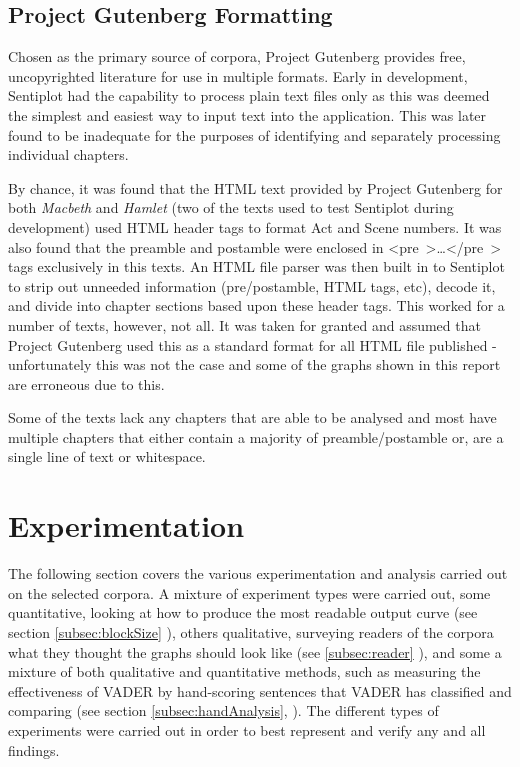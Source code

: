 \documentclass{article}
\begin{document}
{    \subsection{Project Gutenberg Formatting}
    \label{subsec:gutenbergFormat}
            Chosen as the primary source of corpora, Project Gutenberg provides free, uncopyrighted literature for use in multiple formats. Early in development, Sentiplot had the capability to process plain text files only as this was deemed the simplest and easiest way to input text into the application. This was later found to be inadequate for the purposes of identifying and separately processing individual chapters.

            By chance, it was found that the HTML text provided by Project Gutenberg for both \textit{Macbeth} and \textit{Hamlet} (two of the texts used to test Sentiplot during development) used HTML header tags to format Act and Scene numbers. It was also found that the preamble and postamble were enclosed in \mbox{\textless pre \textgreater \dots \textless /pre \textgreater} tags exclusively in this texts. An HTML file parser was then built in to Sentiplot to strip out unneeded information (pre/postamble, HTML tags, etc), decode it, and divide into chapter sections based upon these header tags. This worked for a number of texts, however, not all. It was taken for granted and assumed that Project Gutenberg used this as a standard format for all HTML file published - unfortunately this was not the case and some of the graphs shown in this report are erroneous due to this.
            
            Some of the texts lack any chapters that are able to be analysed and most have multiple chapters that either contain a majority of preamble/postamble or, are a single line of text or whitespace.
\newpage
\section{Experimentation}
\label{sec:experiments}
The following section covers the various experimentation and analysis carried out on the selected corpora. A mixture of experiment types were carried out, some quantitative, looking at how to produce the most readable output curve (see section \ref{subsec:blockSize} ), others qualitative, surveying readers of the corpora what they thought the graphs should look like (see \ref{subsec:reader} ), and some a mixture of both qualitative and quantitative methods, such as measuring the effectiveness of VADER by hand-scoring sentences that VADER has classified and comparing (see section \ref{subsec:handAnalysis}, ). The different types of experiments were carried out in order to best represent and verify any and all findings.

}
\end{document}
